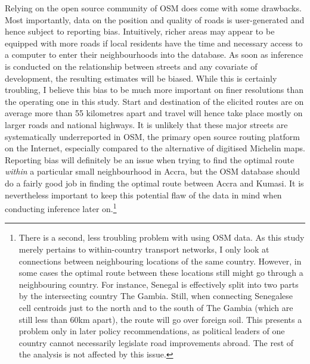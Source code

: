 \documentclass[11pt, oneside]{article}   	%
\begin{document}

Relying on the open source community of OSM does come with some drawbacks. Most importantly, data on the position and quality of roads is user-generated and hence subject to reporting bias. Intuitively, richer areas may appear to be equipped with more roads if local residents have the time and necessary access to a computer to enter their neighbourhoods into the database. As soon as inference is conducted on the relationship between streets and any covariate of development, the resulting estimates will be biased. While this is certainly troubling, I believe this bias to be much more important on finer resolutions than the operating one in this study. Start and destination of the elicited routes are on average more than 55 kilometres apart and travel will hence take place mostly on larger roads and national highways. It is unlikely that these major streets are systematically underreported in OSM, the primary open source routing platform on the Internet, especially compared to the alternative of digitised Michelin maps. Reporting bias will definitely be an issue when trying to find the optimal route \emph{within} a particular small neighbourhood in Accra, but the OSM database should do a fairly good job in finding the optimal route between Accra and Kumasi. It is nevertheless important to keep this potential flaw of the data in mind when conducting inference later on.\footnote{There is a second, less troubling problem with using OSM data. As this study merely pertains to within-country transport networks, I only look at connections between neighbouring locations of the same country. However, in some cases the optimal route between these locations still might go through a neighbouring country. For instance, Senegal is effectively split into two parts by the intersecting country The Gambia. Still, when connecting Senegalese cell centroids just to the north and to the south of The Gambia (which are still less than 60km apart), the route will go over foreign soil. This presents a problem only in later policy recommendations, as political leaders of one country cannot necessarily legislate road improvements abroad. The rest of the analysis is not affected by this issue.}
\end{document}
